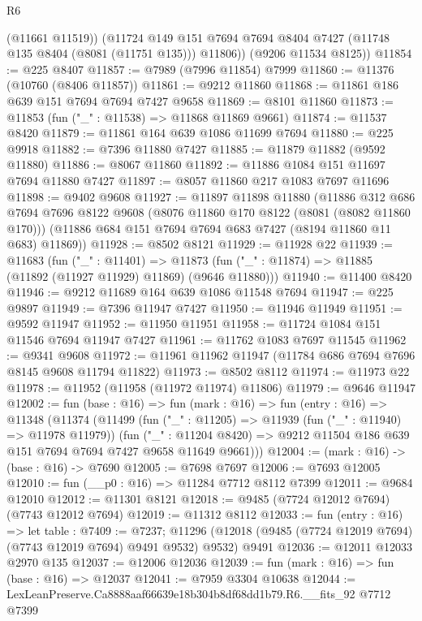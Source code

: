 \begin{lexlean}{R6}
\begin{coremodule}
          (@11661 @11519))
        (@11724 @149 @151 @7694 @7694 @8404 @7427 (@11748 @135 @8404 (@8081 (@11751 @135))) @11806))
      (@9206 @11534 @8125))
@11854 := @225 @8407
@11857 := @7989 (@7996 @11854) @7999
@11860 := @11376 (@10760 (@8406 @11857))
@11861 := @9212 @11860
@11868 := @11861 @186 @639 @151 @7694 @7694 @7427 @9658
@11869 := @8101 @11860
@11873 := @11853 (fun ("_" : @11538) => @11868 @11869 @9661)
@11874 := @11537 @8420
@11879 := @11861 @164 @639 @1086 @11699 @7694
@11880 := @225 @9918
@11882 := @7396 @11880 @7427
@11885 := @11879 @11882 (@9592 @11880)
@11886 := @8067 @11860
@11892 := @11886 @1084 @151 @11697 @7694 @11880 @7427
@11897 := @8057 @11860 @217 @1083 @7697 @11696
@11898 := @9402 @9608
@11927 := @11897
    @11898
    @11880
    (@11886
      @312
      @686
      @7694
      @7696
      @8122
      @9608
      (@8076 @11860 @170 @8122 (@8081 (@8082 @11860 @170)))
      (@11886 @684 @151 @7694 @7694 @683 @7427 (@8194 @11860 @11 @683) @11869))
@11928 := @8502 @8121
@11929 := @11928 @22
@11939 := @11683
    (fun ("_" : @11401) =>
    @11873 (fun ("_" : @11874) => @11885 (@11892 (@11927 @11929) @11869) (@9646 @11880)))
@11940 := @11400 @8420
@11946 := @9212 @11689 @164 @639 @1086 @11548 @7694
@11947 := @225 @9897
@11949 := @7396 @11947 @7427
@11950 := @11946 @11949
@11951 := @9592 @11947
@11952 := @11950 @11951
@11958 := @11724 @1084 @151 @11546 @7694 @11947 @7427
@11961 := @11762 @1083 @7697 @11545
@11962 := @9341 @9608
@11972 := @11961 @11962 @11947 (@11784 @686 @7694 @7696 @8145 @9608 @11794 @11822)
@11973 := @8502 @8112
@11974 := @11973 @22
@11978 := @11952 (@11958 (@11972 @11974) @11806)
@11979 := @9646 @11947
@12002 := fun (base : @16) =>
  fun (mark : @16) =>
  fun (entry : @16) =>
  @11348
    (@11374
      (@11499
        (fun ("_" : @11205) => @11939 (fun ("_" : @11940) => @11978 @11979))
        (fun ("_" : @11204 @8420) =>
        @9212 @11504 @186 @639 @151 @7694 @7694 @7427 @9658 @11649 @9661)))
@12004 := (mark : @16) -> (base : @16) -> @7690
@12005 := @7698 @7697
@12006 := @7693 @12005
@12010 := fun (__p0 : @16) => @11284 @7712 @8112 @7399
@12011 := @9684 @12010
@12012 := @11301 @8121
@12018 := @9485 (@7724 @12012 @7694) (@7743 @12012 @7694)
@12019 := @11312 @8112
@12033 := fun (entry : @16) =>
  let table : @7409 := @7237;
  @11296 (@12018 (@9485 (@7724 @12019 @7694) (@7743 @12019 @7694) @9491 @9532) @9532) @9491
@12036 := @12011 @12033 @2970 @135
@12037 := @12006 @12036
@12039 := fun (mark : @16) => fun (base : @16) => @12037
@12041 := @7959 @3304 @10638
@12044 := LexLeanPreserve.Ca8888aaf66639e18b304b8df68dd1b79.R6.__fits_92 @7712 @7399

\end{coremodule}
\end{lexlean}
